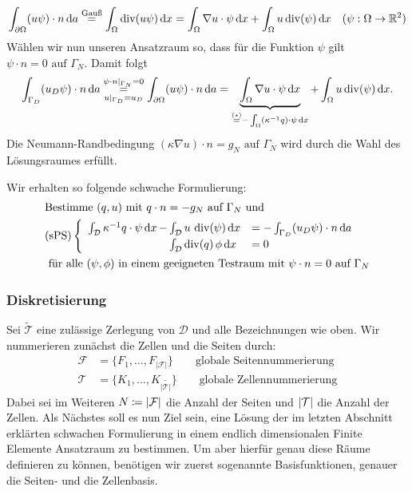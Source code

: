 \[ \int_{\partial\Omega} (u\psi) \cdot n \, \mathrm{d} a \stackrel{\text{Gauß}}{=} 
 \int_{\Omega} \operatorname{div}(u\psi) \, \mathrm{d} x = \int_{\Omega} \nabla u \cdot \psi \, \mathrm{d} x + \int_{\Omega} u \operatorname{div}(\psi) \, \mathrm{d} x \quad (\psi:\Omega \to \mathbb{R}^2) \]
Wählen wir nun unseren Ansatzraum so, dass  für die Funktion $ \psi$ gilt $ \psi \cdot n = 0 \text{ auf } \Gamma_N $. Damit folgt
\begin{align*}
\int_{\Gamma_D} (u_D\psi) \cdot n \, \mathrm{d} a \overset{\psi \cdot n|_{\Gamma_N} = 0}{\underset{u |_{\Gamma_D} = u_D} {=}} \int_{\partial\Omega} (u\psi) \cdot n \, \mathrm{d} a = \underbrace{\int_{\Omega} \nabla u \cdot \psi \, \mathrm{d} x}_{\stackrel{(\star)}{=}- \int_{\Omega} (\kappa^{-1} q) \cdot \psi \, \mathrm{d} x } + \int_{\Omega} u \operatorname{div}(\psi) \, \mathrm{d} x.
\end{align*}
Die Neumann-Randbedingung $ (\kappa\nabla u) \cdot n = g_N \text{ auf } \Gamma_N $ wird durch die Wahl des Lösungsraumes erfüllt.


Wir erhalten so folgende schwache Formulierung:
\label{sPS}
\begin{align*}
&\text{Bestimme } (q,u) \text{ mit } q\cdot n = -g_N \text{ auf } \Gamma_N \text{ und}\\
&\text{(sPS)}\begin{cases}
\begin{array}{llll}
\int_{\mathcal{D}} \kappa^{-1} q \cdot \psi \, \mathrm{d} x \, - \mkern-15mu &\int_{\mathcal{D}} u \, \operatorname{div}(\psi) \, \mathrm{d} x &= - \int_{\Gamma_D} (u_D \psi) \cdot n \, \mathrm{d} a\\
&\int_{\mathcal{D}} \operatorname{div}(q) \, \phi \, \mathrm{d} x &= 0
\end{array}
\end{cases}	\\
&\text{ für alle } (\psi, \phi) \text{ in einem geeigneten Testraum mit } \psi \cdot n = 0 \text{ auf } \Gamma_N 
\end{align*}

\subsubsection{Diskretisierung}
Sei $ \widetilde{\mathcal{T}}  $ eine zulässige Zerlegung von $ \mathcal{D} $ und alle Bezeichnungen wie oben.
Wir nummerieren zunächst die Zellen und die Seiten durch:
\begin{align*}
	\mathcal{F} &= \{ F_1,\dots,F_{|\mathcal{F}|}\} \qquad \text{globale Seitennummerierung} \\
	\mathcal{T} &=  \{ K_1,\dots,K_{|\widetilde{\mathcal{T}|}}\} \qquad \text{globale Zellennummerierung}
\end{align*}
Dabei sei im Weiteren $ N \coloneqq | \mathcal{F} | $ die Anzahl der Seiten und $| \mathcal{T} |$ die Anzahl der Zellen.
Als Nächstes soll es nun Ziel sein, eine Lösung der im letzten Abschnitt erklärten schwachen Formulierung in einem endlich dimensionalen Finite Elemente Ansatzraum zu bestimmen. Um aber hierfür genau diese Räume definieren zu können, benötigen wir zuerst sogenannte Basisfunktionen, genauer die Seiten- und die Zellenbasis.\\

